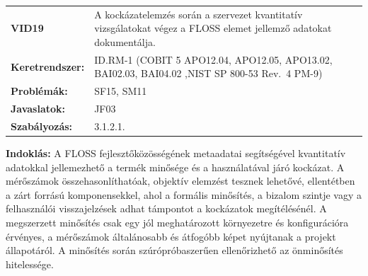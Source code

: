 \documentclass[12pt,magyar,a4paper,oneside]{scrreprt}
\begin{document}
\begin{longtable}[]{@{}ll@{}}
\toprule
\endhead
\begin{minipage}[t]{0.16\columnwidth}\raggedright
\textbf{VID19}\strut
\end{minipage} & \begin{minipage}[t]{0.79\columnwidth}\raggedright
A kockázatelemzés során a szervezet kvantitatív vizsgálatokat végez a
FLOSS elemet jellemző adatokat dokumentálja.\strut
\end{minipage}\tabularnewline
\begin{minipage}[t]{0.16\columnwidth}\raggedright
\textbf{Keretrendszer:}\strut
\end{minipage} & \begin{minipage}[t]{0.79\columnwidth}\raggedright
ID.RM-1 (COBIT 5 APO12.04, APO12.05, APO13.02, BAI02.03, BAI04.02 ,NIST
SP 800-53 Rev.~4 PM-9)\strut
\end{minipage}\tabularnewline
\begin{minipage}[t]{0.16\columnwidth}\raggedright
\textbf{Problémák:}\strut
\end{minipage} & \begin{minipage}[t]{0.79\columnwidth}\raggedright
SF15, SM11\strut
\end{minipage}\tabularnewline
\begin{minipage}[t]{0.16\columnwidth}\raggedright
\textbf{Javaslatok:}\strut
\end{minipage} & \begin{minipage}[t]{0.79\columnwidth}\raggedright
JF03\strut
\end{minipage}\tabularnewline
\begin{minipage}[t]{0.16\columnwidth}\raggedright
\textbf{Szabályozás:}\strut
\end{minipage} & \begin{minipage}[t]{0.79\columnwidth}\raggedright
3.1.2.1.\strut
\end{minipage}\tabularnewline
\bottomrule
\end{longtable}

\textbf{Indoklás: } A FLOSS fejlesztőközösségének metaadatai
segítségével kvantitatív adatokkal jellemezhető a termék minősége és a
használatával járó kockázat. A mérőszámok összehasonlíthatóak, objektív
elemzést tesznek lehetővé, ellentétben a zárt forrású komponensekkel,
ahol a formális minősítés, a bizalom szintje vagy a felhasználói
visszajelzések adhat támpontot a kockázatok megítélésénél. A megszerzett
minősítés csak egy jól meghatározott környezetre és konfigurációra
érvényes, a mérőszámok általánosabb és átfogóbb képet nyújtanak a
projekt állapotáról. A minősítés során szúrópróbaszerűen ellenőrizhető
az önminősítés hitelessége.
\end{document}
